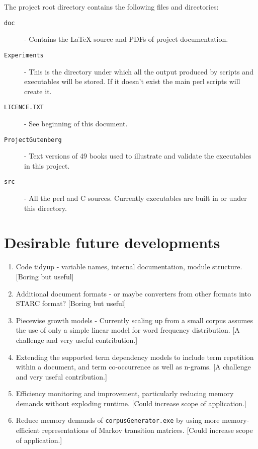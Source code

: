 \documentclass{article}
\begin{document}
The project root directory contains the following files and directories:

\begin{description}
  \item[\texttt{doc}] - Contains the LaTeX source and PDFs of project documentation.
  \item[\texttt{Experiments}] - This is the directory under which all
    the output produced by scripts and executables will be stored.  If
    it doesn't exist the main perl scripts will create it.
\item[\texttt{LICENCE.TXT}] - See beginning of this document.
  \item[\texttt{ProjectGutenberg}] - Text versions of 49 books used to
    illustrate and validate the executables in this project.
  \item[\texttt{src}] - All the perl and C sources.  Currently
    executables are built in or under this directory.
\end{description}

\section{Desirable future developments}

\begin{enumerate}
  \item Code tidyup - variable names, internal documentation, module
    structure.  [Boring but useful]
    \item Additional document formats - or maybe converters from other
      formats into STARC format?  [Boring but useful]
      \item Piecewise growth models - Currently scaling up from a
        small corpus assumes the use of only a simple linear model for
        word frequency distribution.  [A challenge and very useful
          contribution.]
        \item Extending the supported term dependency models to include
          term repetition within a document, and term co-occurrence as
          well as n-grams. [A challenge and very useful
          contribution.]
        \item Efficiency monitoring and improvement, particularly
          reducing memory demands without exploding runtime.  [Could
            increase scope of application.]
          \item Reduce memory demands of \verb|corpusGenerator.exe| by
            using more memory-efficient representations of Markov
            transition matrices.  [Could
            increase scope of application.]
        \end{enumerate}
\end{document}
